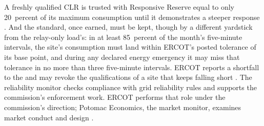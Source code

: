 A freshly qualified CLR is trusted with Responsive Reserve equal to only 20~percent of its maximum consumption until it demonstrates a steeper response \autocite{ercotclrtest2024}. %
And the standard, once earned, must be kept, though by a different yardstick from the relay-only load's: in at least 85~percent of the month's five-minute intervals, the site's consumption must land within ERCOT's posted tolerance of its base point, and during any declared energy emergency it may miss that tolerance in no more than three five-minute intervals. ERCOT reports a shortfall to the  and may revoke the qualifications of a site that keeps falling short \autocite{ercot2026protocols}. %
The reliability monitor checks compliance with grid reliability rules and supports the commission's enforcement work. ERCOT performs that role under the commission's direction; Potomac Economics, the market monitor, examines market conduct and design \autocite{ercot2026reliabilitymonitor,potomac2026somercot}.

